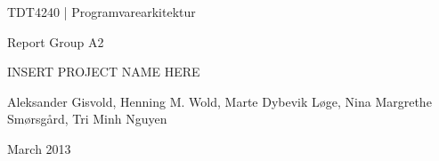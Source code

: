 \begin{titlepage}
\begin{center}
\vspace*{1in}
{\LARGE TDT4240 | Programvarearkitektur}
\par
\vspace{1in}
{\LARGE Report Group A2}
\par
\vspace{1in}
{\LARGE INSERT PROJECT NAME HERE} %
\par
\vfill
\par
\vspace{0.5in}
Aleksander Gisvold, Henning M. Wold, Marte Dybevik Løge, Nina Margrethe Smørsgård, Tri Minh Nguyen
\par
March 2013 %
\end{center}
\end{titlepage}
